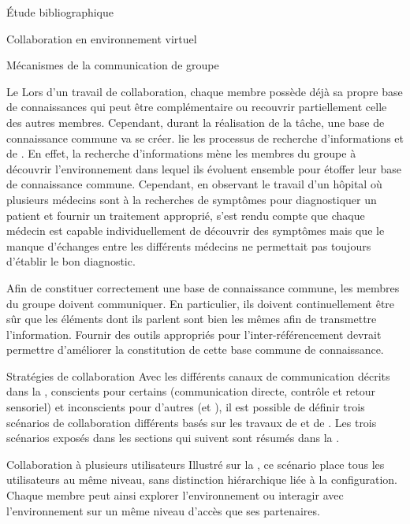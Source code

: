 \documentclass[myfrancais,ngerman,english,french]{mythesis}
\begin{document}
\begin{mychapter}{Étude bibliographique}
\begin{mysection}{Collaboration en environnement virtuel}
\begin{mysubsection}{Mécanismes de la communication de groupe}
\begin{mysubsubsection}{Le \mygrounding}
					Lors d'un travail de collaboration, chaque membre possède déjà sa propre base de connaissances qui peut être complémentaire ou recouvrir partiellement celle des autres membres.
					Cependant, durant la réalisation de la tâche, une base de connaissance commune va se créer.
					 lie les processus de recherche d'informations et de \mygrounding.
					En effet, la recherche d'informations mène les membres du groupe à découvrir l'environnement dans lequel ils évoluent ensemble pour étoffer leur base de connaissance commune.
					Cependant, en observant le travail d'un hôpital où plusieurs médecins sont à la recherches de symptômes pour diagnostiquer un patient et fournir un traitement approprié,  s'est rendu compte que chaque médecin est capable individuellement de découvrir des symptômes mais que le manque d'échanges entre les différents médecins ne permettait pas toujours d'établir le bon diagnostic.

					Afin de constituer correctement une base de connaissance commune, les membres du groupe doivent communiquer.
					En particulier, ils doivent continuellement être sûr que les éléments dont ils parlent sont bien les mêmes afin de transmettre l'information.
					Fournir des outils appropriés pour l'inter-référencement devrait permettre d'améliorer la constitution de cette base commune de connaissance.
				\end{mysubsubsection}
			\end{mysubsection}
			\begin{mysubsection}{Stratégies de collaboration}
				Avec les différents canaux de communication décrits dans la , conscients pour certains (communication directe, contrôle et retour sensoriel) et inconscients pour d'autres (\myfeedthrough et \mygrounding), il est possible de définir trois scénarios de collaboration différents basés sur les travaux de  et de .
				Les trois scénarios exposés dans les sections qui suivent sont résumés dans la .
				\begin{mysubsubsection}{Collaboration à plusieurs utilisateurs}
					Illustré sur la , ce scénario place tous les utilisateurs au même niveau, sans distinction hiérarchique liée à la configuration.
					Chaque membre peut ainsi explorer l'environnement ou interagir avec l'environnement sur un même niveau d'accès que ses partenaires.


\end{mysubsubsection}
\end{mysubsection}
\end{mysection}
\end{mychapter}
\end{document}
